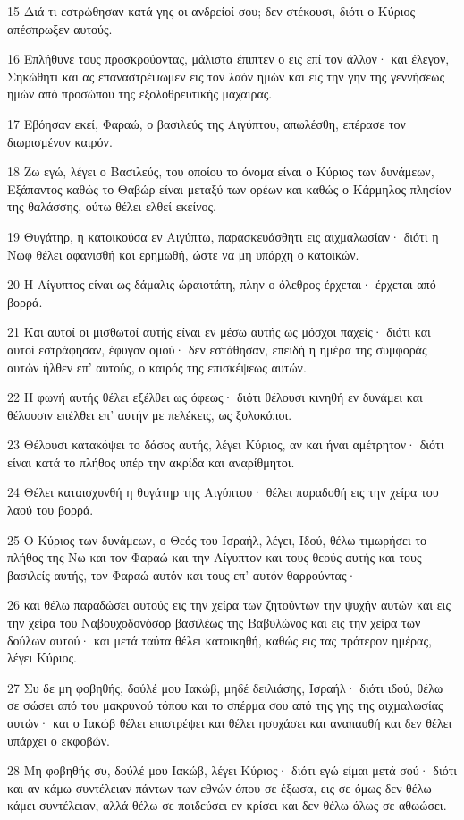 \par 15 Διά τι εστρώθησαν κατά γης οι ανδρείοί σου; δεν στέκουσι, διότι ο Κύριος απέσπρωξεν αυτούς.
\par 16 Επλήθυνε τους προσκρούοντας, μάλιστα έπιπτεν ο εις επί τον άλλον· και έλεγον, Σηκώθητι και ας επαναστρέψωμεν εις τον λαόν ημών και εις την γην της γεννήσεως ημών από προσώπου της εξολοθρευτικής μαχαίρας.
\par 17 Εβόησαν εκεί, Φαραώ, ο βασιλεύς της Αιγύπτου, απωλέσθη, επέρασε τον διωρισμένον καιρόν.
\par 18 Ζω εγώ, λέγει ο Βασιλεύς, του οποίου το όνομα είναι ο Κύριος των δυνάμεων, Εξάπαντος καθώς το Θαβώρ είναι μεταξύ των ορέων και καθώς ο Κάρμηλος πλησίον της θαλάσσης, ούτω θέλει ελθεί εκείνος.
\par 19 Θυγάτηρ, η κατοικούσα εν Αιγύπτω, παρασκευάσθητι εις αιχμαλωσίαν· διότι η Νωφ θέλει αφανισθή και ερημωθή, ώστε να μη υπάρχη ο κατοικών.
\par 20 Η Αίγυπτος είναι ως δάμαλις ώραιοτάτη, πλην ο όλεθρος έρχεται· έρχεται από βορρά.
\par 21 Και αυτοί οι μισθωτοί αυτής είναι εν μέσω αυτής ως μόσχοι παχείς· διότι και αυτοί εστράφησαν, έφυγον ομού· δεν εστάθησαν, επειδή η ημέρα της συμφοράς αυτών ήλθεν επ' αυτούς, ο καιρός της επισκέψεως αυτών.
\par 22 Η φωνή αυτής θέλει εξέλθει ως όφεως· διότι θέλουσι κινηθή εν δυνάμει και θέλουσιν επέλθει επ' αυτήν με πελέκεις, ως ξυλοκόποι.
\par 23 Θέλουσι κατακόψει το δάσος αυτής, λέγει Κύριος, αν και ήναι αμέτρητον· διότι είναι κατά το πλήθος υπέρ την ακρίδα και αναρίθμητοι.
\par 24 Θέλει καταισχυνθή η θυγάτηρ της Αιγύπτου· θέλει παραδοθή εις την χείρα του λαού του βορρά.
\par 25 Ο Κύριος των δυνάμεων, ο Θεός του Ισραήλ, λέγει, Ιδού, θέλω τιμωρήσει το πλήθος της Νω και τον Φαραώ και την Αίγυπτον και τους θεούς αυτής και τους βασιλείς αυτής, τον Φαραώ αυτόν και τους επ' αυτόν θαρρούντας·
\par 26 και θέλω παραδώσει αυτούς εις την χείρα των ζητούντων την ψυχήν αυτών και εις την χείρα του Ναβουχοδονόσορ βασιλέως της Βαβυλώνος και εις την χείρα των δούλων αυτού· και μετά ταύτα θέλει κατοικηθή, καθώς εις τας πρότερον ημέρας, λέγει Κύριος.
\par 27 Συ δε μη φοβηθής, δούλέ μου Ιακώβ, μηδέ δειλιάσης, Ισραήλ· διότι ιδού, θέλω σε σώσει από του μακρυνού τόπου και το σπέρμα σου από της γης της αιχμαλωσίας αυτών· και ο Ιακώβ θέλει επιστρέψει και θέλει ησυχάσει και αναπαυθή και δεν θέλει υπάρχει ο εκφοβών.
\par 28 Μη φοβηθής συ, δούλέ μου Ιακώβ, λέγει Κύριος· διότι εγώ είμαι μετά σού· διότι και αν κάμω συντέλειαν πάντων των εθνών όπου σε έξωσα, εις σε όμως δεν θέλω κάμει συντέλειαν, αλλά θέλω σε παιδεύσει εν κρίσει και δεν θέλω όλως σε αθωώσει.

